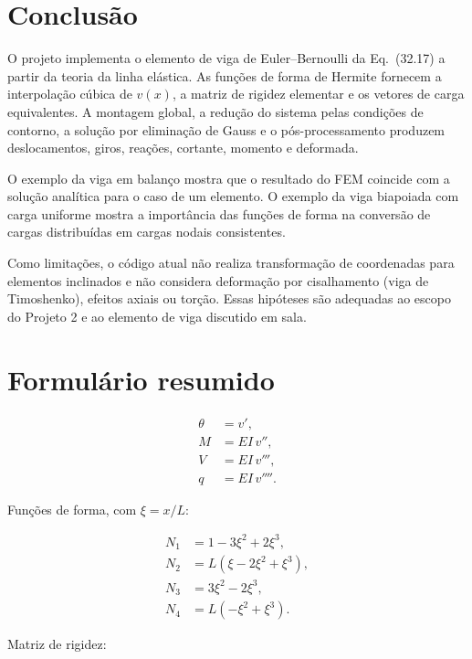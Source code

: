 \documentclass[12pt,a4paper]{article}
\begin{document}
\section{Conclusão}
\label{sec:conclusao}

O projeto implementa o elemento de viga de Euler--Bernoulli da Eq.~(32.17) a partir da teoria da linha elástica. As funções de forma de Hermite fornecem a interpolação cúbica de \(v(x)\), a matriz de rigidez elementar e os vetores de carga equivalentes. A montagem global, a redução do sistema pelas condições de contorno, a solução por eliminação de Gauss e o pós-processamento produzem deslocamentos, giros, reações, cortante, momento e deformada.

O exemplo da viga em balanço mostra que o resultado do FEM coincide com a solução analítica para o caso de um elemento. O exemplo da viga biapoiada com carga uniforme mostra a importância das funções de forma na conversão de cargas distribuídas em cargas nodais consistentes.

Como limitações, o código atual não realiza transformação de coordenadas para elementos inclinados e não considera deformação por cisalhamento (viga de Timoshenko), efeitos axiais ou torção. Essas hipóteses são adequadas ao escopo do Projeto 2 e ao elemento de viga discutido em sala.

\appendix

\section{Formulário resumido}
\label{app:formulario}

\begin{align}
  \theta &= v', \label{eq:app_theta}\\
  M &= EI\,v'', \label{eq:app_M}\\
  V &= EI\,v''', \label{eq:app_V}\\
  q &= EI\,v''''. \label{eq:app_q}
\end{align}

Funções de forma, com \(\xi=x/L\):

\begin{align}
  N_1 &= 1-3\xi^2+2\xi^3, \\
  N_2 &= L(\xi-2\xi^2+\xi^3), \\
  N_3 &= 3\xi^2-2\xi^3, \\
  N_4 &= L(-\xi^2+\xi^3).
\end{align}

Matriz de rigidez:
\end{document}
